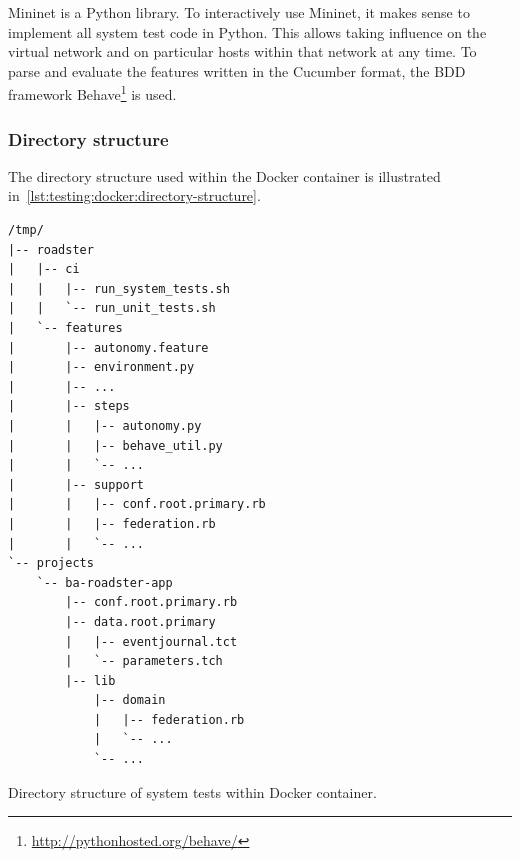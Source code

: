 Mininet is a Python library. To interactively use Mininet, it makes sense to
implement all system test code in Python. This allows taking influence on the
virtual network and on particular hosts within that network at any time. To
parse and evaluate the features written in the Cucumber format, the \gls{BDD}
framework Behave\footnote{\url{http://pythonhosted.org/behave/}} is used.

\subsubsection{Directory structure}

The directory structure used within the Docker container is illustrated
in~\autoref{lst:testing:docker:directory-structure}.

\begin{listing}
	\begin{verbatim}
/tmp/
|-- roadster
|   |-- ci
|   |   |-- run_system_tests.sh
|   |   `-- run_unit_tests.sh
|   `-- features
|       |-- autonomy.feature
|       |-- environment.py
|       |-- ...
|       |-- steps
|       |   |-- autonomy.py
|       |   |-- behave_util.py
|       |   `-- ...
|       |-- support
|       |   |-- conf.root.primary.rb
|       |   |-- federation.rb
|       |   `-- ...
`-- projects
	`-- ba-roadster-app
		|-- conf.root.primary.rb
		|-- data.root.primary
		|   |-- eventjournal.tct
		|   `-- parameters.tch
		|-- lib
			|-- domain
			|   |-- federation.rb
			|   `-- ...
			`-- ...
	\end{verbatim}
	\caption{Directory structure of system tests within Docker container.}
	\label{lst:testing:docker:directory-structure}
\end{listing}

